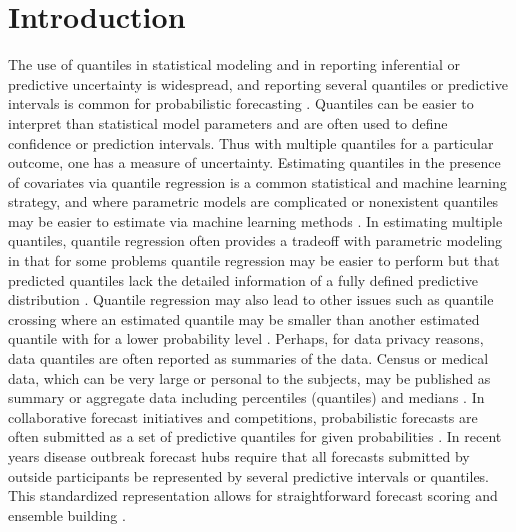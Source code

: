 \documentclass[preprint,12pt,authoryear]{elsarticle}
\begin{document}


\section{Introduction} \label{seq:intro}

The use of quantiles in statistical modeling and in reporting inferential or predictive uncertainty is widespread, and reporting several quantiles or predictive intervals is common for probabilistic forecasting \cite[]{gneiting2023model}. Quantiles can be easier to interpret than statistical model parameters and are often used to define confidence or prediction intervals. Thus with multiple quantiles for a particular outcome, one has a measure of uncertainty.
Estimating quantiles in the presence of covariates via 
quantile regression is a common
statistical and machine learning strategy, and where parametric models are complicated or nonexistent quantiles may be easier to estimate via machine learning methods \cite[]{martin2022direct,chung2021beyond, koenker2017quantile, koenker1978regression}. In estimating multiple quantiles, quantile regression often provides a tradeoff with parametric modeling in that for some problems quantile regression may be easier to perform but that predicted quantiles lack the detailed information of a fully defined predictive distribution \cite[]{pohle2020murphy}. Quantile regression may also lead to other issues such as quantile crossing where an estimated quantile may be smaller than another estimated quantile with for a lower probability level \cite[]{chernozhukov2010quantile,he1997quantile}.
Perhaps, for data privacy reasons, data quantiles are often reported as summaries of the data.
Census or medical data, which can be very large or personal to the subjects, may be published as summary or aggregate data including percentiles (quantiles) and medians \cite[]{simpson2023interpolating,cdc2022growthcharts,nirwan2020bayesian}. In collaborative forecast initiatives and competitions, probabilistic forecasts are often submitted as a set of predictive quantiles for given probabilities \cite[]{gneiting2023model,hong2016probabilistic}. In recent years disease outbreak forecast hubs require that all forecasts submitted by outside participants be represented by  several predictive intervals or quantiles. This standardized representation allows for straightforward forecast scoring and ensemble building \cite[]{mathis2024evaluation,mathis2023flusight,Cramer2022-hub-dataset,cramer2022evaluation,sherratt2023predictive,bracher2021evaluating}.
 
\end{document}
